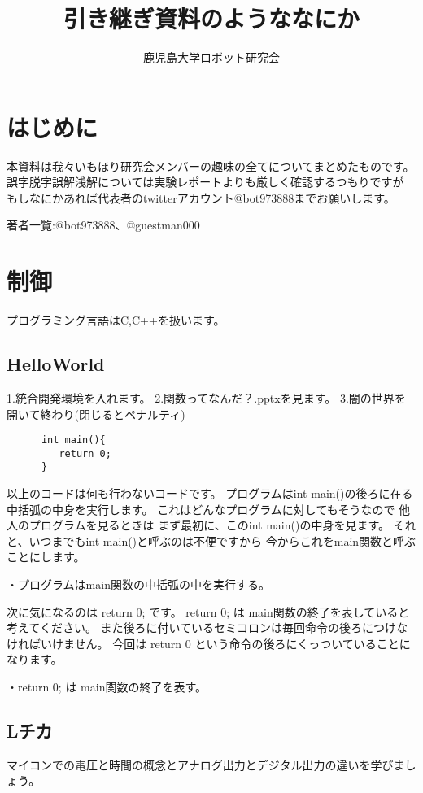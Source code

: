 \documentclass{jarticle}
\begin{document}
\title{引き継ぎ資料のようななにか}
\author{鹿児島大学ロボット研究会}

\maketitle

\tableofcontents
\clearpage

\section{はじめに}
本資料は我々いもほり研究会メンバーの趣味の全てについてまとめたものです。
誤字脱字誤解浅解については実験レポートよりも厳しく確認するつもりですが
もしなにかあれば代表者のtwitterアカウント@bot973888までお願いします。

著者一覧:@bot973888、@guestman000
\clearpage

\section{制御}
   プログラミング言語はC,C++を扱います。
   \subsection{HelloWorld}
      1.統合開発環境を入れます。
      2.関数ってなんだ？.pptxを見ます。
      3.闇の世界を開いて終わり(閉じるとペナルティ)
      
   \begin{lstlisting}
      int main(){
         return 0;
      }
   \end{lstlisting}
   以上のコードは何も行わないコードです。
   プログラムはint main()の後ろに在る中括弧の中身を実行します。
   これはどんなプログラムに対してもそうなので
   他人のプログラムを見るときは
   まず最初に、このint main()の中身を見ます。
   それと、いつまでもint main()と呼ぶのは不便ですから
   今からこれをmain関数と呼ぶことにします。
   
     
   ・プログラムはmain関数の中括弧の中を実行する。
  
  
   次に気になるのは return 0; です。
   return 0; は main関数の終了を表していると考えてください。
   また後ろに付いているセミコロンは毎回命令の後ろにつけなければいけません。
   今回は return 0 という命令の後ろにくっついていることになります。


   ・return 0; は main関数の終了を表す。

   \subsection{Lチカ}
      マイコンでの電圧と時間の概念とアナログ出力とデジタル出力の違いを学びましょう。
\end{document}
